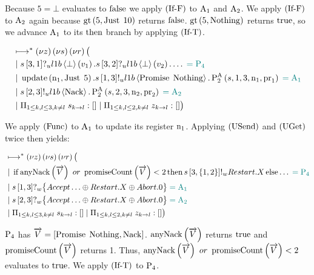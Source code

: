 Because $5 = \bot$ evaluates to $\False$ we apply $\RIfF$ to $\Acceptor{1}$ and $\Acceptor{2}$.
We apply $\RIfF$ to $\Acceptor{2}$ again because $\greaterThan{5}{\Just{10}}$ returns $\False$.
$\greaterThan{5}{\Nothing}$ returns $\True$, so we advance $\Acceptor{1}$ to its $\Then{}$ branch by applying $\RIfT$.

\begin{align*}
&\mapstostar\NuChannels\big (\\
&\Or
    \ReceiveUnreliableP{\ChannelS}{3}{1}{\LOneB}{\bot}{v_1}.
    \ReceiveUnreliableP{\ChannelS}{3}{2}{\LOneB}{\bot}{v_2}.
    \ldots
    \comment{= \Proposer{4}}\\
&\Or
    \update{\NumberRegister_1}{\Just{5}}.
    \SendUnreliableP{\ChannelS}{1}{3}{\LOneB}{\Promise{\Nothing}}.
    \Call{\PaTwo}{\ChannelS, 1, 3, \NumberRegister_1, \ProposalRegister_1}
    \comment{= \Acceptor{1}}\\
&\Or
    \SendUnreliableP{\ChannelS}{2}{3}{\LOneB}{\Nack}.
    \Call{\PaTwo}{\ChannelS, 2, 3, \NumberRegister_2, \ProposalRegister_2}
    \comment{= \Acceptor{2}}\\
&\Or \InnerSessionQueues{\ChannelS}
\Or \OuterSessionQueues
\big )
\end{align*}

We apply $\RSideEffect$ to $\Acceptor{1}$ to update its register $\NumberRegister_1$.
Applying $\RUsend$ and $\RUget$ twice then yields:

\begin{align*}
&\mapstostar\NuChannels\big (\\
&\Or
    \If{\anyNack{\VectorV} \tOr \promiseCount{\VectorV} < 2}
    \Then{\SendWeaklyP{\ChannelS}{3}{\Curly{1, 2}}{\Restart}{\RecursionVariable}}
    \Else{\ldots}
    \comment{= \Proposer{4}}\\
&\Or
    \ReceiveWeaklyP{\ChannelS}{1}{3}{\BeginPaCont}
    \comment{= \Acceptor{1}}\\
&\Or
    \ReceiveWeaklyP{\ChannelS}{2}{3}{\BeginPaCont}
    \comment{= \Acceptor{2}}\\
&\Or \InnerSessionQueues{\ChannelS}
\Or \OuterSessionQueues
\big )
\end{align*}

$\Proposer{4}$ has $\VectorV = \Bracket{\Promise{\Nothing}, \Nack}$.
$\anyNack{\VectorV}$ returns $\True$ and $\promiseCount{\VectorV}$ returns 1.
Thus, $\anyNack{\VectorV} \tOr \promiseCount{\VectorV} < 2$ evaluates to $\True$.
We apply $\RIfT$ to $\Proposer{4}$.

